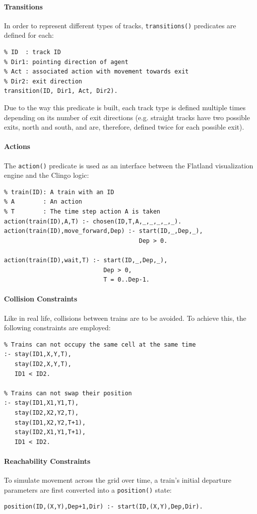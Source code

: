 \paragraph{Transitions}
In order to represent different types of tracks, \texttt{transitions()} predicates are defined for each:
\begin{verbatim}
% ID  : track ID
% Dir1: pointing direction of agent
% Act : associated action with movement towards exit
% Dir2: exit direction
transition(ID, Dir1, Act, Dir2).
\end{verbatim}
Due to the way this predicate is built, each track type is defined multiple times depending on its number of exit directions (e.g. straight tracks have two possible exits, north and south, and are, therefore, defined twice for each possible exit).

\paragraph{Actions}
The \texttt{action()} predicate is used as an interface between the Flatland visualization engine and the Clingo logic:
\begin{verbatim}
% train(ID): A train with an ID
% A        : An action
% T        : The time step action A is taken
action(train(ID),A,T) :- chosen(ID,T,A,_,_,_,_,_).
action(train(ID),move_forward,Dep) :- start(ID,_,Dep,_),
                                      Dep > 0.
                                      
action(train(ID),wait,T) :- start(ID,_,Dep,_),
                            Dep > 0,
                            T = 0..Dep-1.
\end{verbatim}

\paragraph{Collision Constraints}
Like in real life, collisions between trains are to be avoided. To achieve this, the following constraints are employed:
\begin{verbatim}
% Trains can not occupy the same cell at the same time
:- stay(ID1,X,Y,T),
   stay(ID2,X,Y,T),
   ID1 < ID2.

% Trains can not swap their position
:- stay(ID1,X1,Y1,T),
   stay(ID2,X2,Y2,T),
   stay(ID1,X2,Y2,T+1),
   stay(ID2,X1,Y1,T+1),
   ID1 < ID2.
\end{verbatim}

\paragraph{Reachability Constraints}
To simulate movement across the grid over time, a train's initial departure parameters are first converted into a \texttt{position()} state:
\begin{verbatim}
position(ID,(X,Y),Dep+1,Dir) :- start(ID,(X,Y),Dep,Dir).
\end{verbatim}

